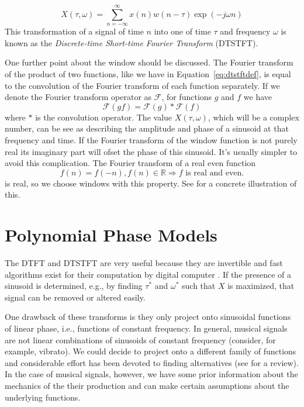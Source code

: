 \begin{equation}
    \label{eq:dtstftdef}
    X(\tau,\omega) = \sum_{n=-\infty}^{\infty} x(n) w(n - \tau) \exp(-j \omega n)
\end{equation}
This transformation of a signal of time $n$ into one of time $\tau$ and
frequency $\omega$ is known as the \textit{Discrete-time Short-time Fourier
Transform} (DTSTFT).

One further point about the window should be discussed. The Fourier transform of
the product of two functions, like we have in Equation~\ref{eq:dtstftdef}, is
equal to the convolution of the Fourier transform of each function separately.
If we denote the Fourier transform operator as $\mathcal{F}$, for functions $g$
and $f$ we have
\[
    \mathcal{F}(gf) = \mathcal{F}(g)\ast\mathcal{F}(f)
\]
where $\ast$ is the convolution operator. The value $X(\tau,\omega)$, which will
be a complex number, can be see
as describing the amplitude and phase of a sinusoid at that frequency and time.
If the Fourier transform of the window function is not purely real its imaginary
part will ofset the phase of this sinusoid. It's usually simpler to avoid this
complication. The Fourier transform of a real even function
\[
    f(n) = f(-n), f(n) \in \mathbb{R} \Rightarrow f\text{ is real and even.}
\]
is real, so we choose windows with this property. See
\cite[p.~52]{harris1978use} for a concrete illustration of this.

\section{Polynomial Phase Models\label{sec:polynomphasemodel}}

The DTFT and DTSTFT are very useful because they are invertible
\cite{portnoff1976implementation} and fast algorithms exist for their 
computation by digital computer \cite{van1992computational}. If the presence of
a sinusoid is determined, e.g., by finding $\tau^{\ast}$ and $\omega^{\ast}$ such that
$X$ is maximized, that signal can be removed or altered easily.

One drawback of these transforms is they only project onto sinusoidal functions
of linear phase, i.e., functions of constant frequency. In general, musical
signals are not linear combinations of sinusoids of constant frequency
(consider, for example, vibrato). We could decide to project onto a different
family of functions and considerable effort has been devoted to finding
alternatives (see \cite{kereliuk2011sparse} for a review). In the case of
musical signals, however, we have some prior information about the mechanics of
the their production and can make certain assumptions about the underlying
functions.

